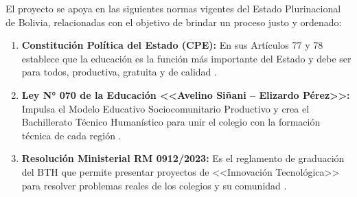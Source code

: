 El proyecto se apoya en las siguientes normas vigentes del Estado Plurinacional de Bolivia, relacionadas con el objetivo de brindar un proceso justo y ordenado:

\begin{enumerate}
    \item \textbf{Constitución Política del Estado (CPE):} En sus Artículos 77 y 78 establece que la educación es la función más importante del Estado y debe ser para todos, productiva, gratuita y de calidad \parencite{cpe2009}.
    \item \textbf{Ley N° 070 de la Educación <<Avelino Siñani -- Elizardo Pérez>>:} Impulsa el Modelo Educativo Sociocomunitario Productivo y crea el Bachillerato Técnico Humanístico para unir el colegio con la formación técnica de cada región \parencite{ley070_2010}.
    \item \textbf{Resolución Ministerial RM 0912/2023:} Es el reglamento de graduación del BTH que permite presentar proyectos de <<Innovación Tecnológica>> para resolver problemas reales de los colegios y su comunidad \parencite{ministerioeducacion2023}.
\end{enumerate}
